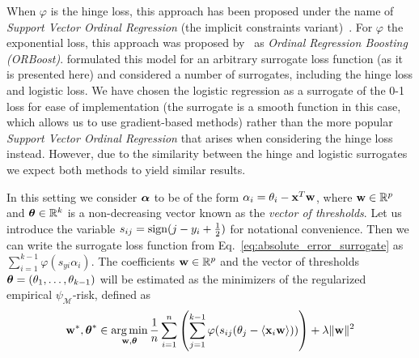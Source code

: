When $\varphi$ is the hinge loss, this approach has been proposed under the name of \emph{Support Vector Ordinal Regression} (the implicit constraints variant)~\citep{Shashua, Chu2007}. For $\varphi$ the exponential loss, this approach was proposed by~\citep{lin2006large} as \emph{Ordinal Regression Boosting (ORBoost)}. \citet{Rennie} formulated this model for an arbitrary surrogate loss function (as it is presented here) and considered a number of surrogates, including the hinge loss and logistic loss. 
We have chosen the logistic regression as a surrogate of the 0-1 loss for ease of implementation (the surrogate is a smooth function in this case, which allows us to use gradient-based methods) rather than the more popular  \emph{Support Vector Ordinal Regression} that arises when considering the hinge loss instead. However, due to the similarity between the hinge and logistic surrogates we expect both methods to yield similar results.









In this setting we consider $\boldsymbol \alpha$ to be of the form $\alpha_i = \theta_i - \mathbf{x}^T \mathbf{w}$, where $\mathbf{w} \in {\mathbb R}^p$ and $\boldsymbol \theta \in {\mathbb R}^k$ is a non-decreasing vector known as the \emph{vector of thresholds}. 
Let us introduce the variable $s_{ij} = \operatorname*{sign}(j - y_i + \frac{1}{2})$ for notational convenience. Then we can write the surrogate loss function from Eq.~\eqref{eq:absolute_error_surrogate} as $\sum_{i=1}^{k-1} \varphi(s_{y i} \alpha_i)$. The coefficients $\mathbf{w} \in {\mathbb R}^p$ and the vector of thresholds $\boldsymbol \theta = (\theta_1, \ldots, \theta_{k-1})$ will be estimated as the minimizers of the regularized empirical $\psi_{\mathcal{M}}$-risk, defined as 
\begin{equation}
\begin{aligned}
 \quad \B{w}^*, \btheta^* &\in \argmin_{\B{w}, \btheta} \frac{1}{n}\sum_{i=1}^n \left( \sum_{j=1}^{k-1} \varphi(s_{ij} (\theta_j - \langle \B{x}_i \B{w} \rangle)) \right) + \lambda \|\B{w}\|^2
\end{aligned}\label{eq:ordinal_logistic}
\end{equation}


